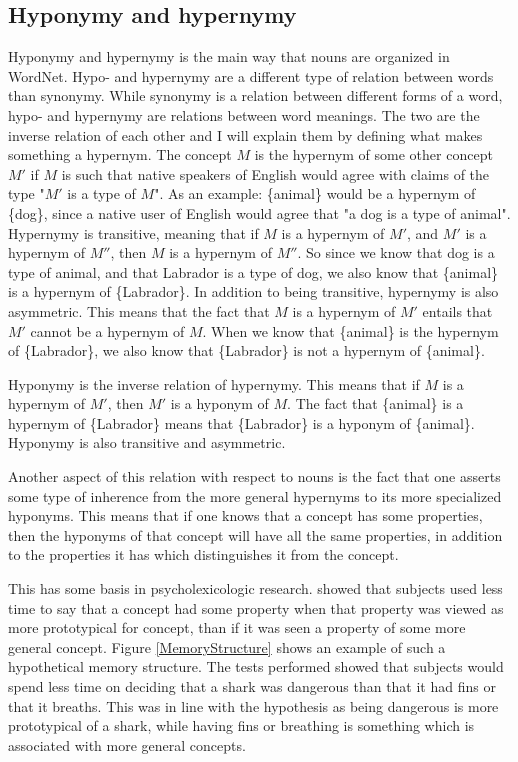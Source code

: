 \subsection{Hyponymy and hypernymy}
\label{Hypernymy}
Hyponymy and hypernymy is the main way that nouns are organized in WordNet.
Hypo- and hypernymy are a different type of relation between words than synonymy.
While synonymy is a relation between different forms of a word,
hypo- and hypernymy are relations between word meanings.
The two are the inverse relation of each other and I will explain them by defining what makes something a hypernym.
The concept $M$ is the hypernym of some other concept $M'$ if $M$ is such that native speakers of English would agree
with claims of the type "$M'$ is a type of $M$".
As an example: \{animal\} would be a hypernym of \{dog\},
since a native user of English would agree that "a dog is a type of animal".
Hypernymy is transitive, meaning that if $M$ is a hypernym of $M'$, and $M'$ is a hypernym of $M''$,
then $M$ is a hypernym of $M''$.
So since we know that dog is a type of animal, and that Labrador is a type of dog,
we also know that \{animal\} is a hypernym of \{Labrador\}.
In addition to being transitive, hypernymy is also asymmetric.
This means that the fact that $M$ is a hypernym of $M'$ entails that $M'$ cannot be a hypernym of $M$.
When we know that \{animal\} is the hypernym of \{Labrador\},
we also know that \{Labrador\} is not a hypernym of \{animal\}\citep{Miller1990}.

Hyponymy is the inverse relation of hypernymy.
This means that if $M$ is a hypernym of $M'$, then $M'$ is a hyponym of $M$.
The fact that \{animal\} is a hypernym of \{Labrador\} means that \{Labrador\} is a hyponym of \{animal\}.
Hyponymy is also transitive and asymmetric\citep{Miller1990}.

Another aspect of this relation with respect to nouns is the fact that one asserts some type of inherence from the more
general hypernyms to its more specialized hyponyms.
This means that if one knows that a concept has some properties,
then the hyponyms of that concept will have all the same properties,
in addition to the properties it has which distinguishes it from the concept\citep{Miller1990a}.

This has some basis in psycholexicologic research.
\citet{Collins1969} showed that subjects used less time to say that a concept had some property when that property
was viewed as more prototypical for concept, than if it was seen a property of some more general concept.
Figure \ref{MemoryStructure} shows an example of such a hypothetical memory structure.
The tests performed showed that subjects would spend less time on deciding that a shark was dangerous than that it had fins or that it breaths.
This was in line with the hypothesis as being dangerous is more prototypical of a shark, while having fins or breathing
is something which is associated with more general concepts.

